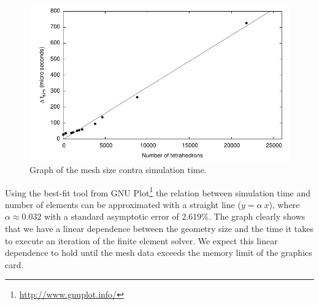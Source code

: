 \begin{figure}
  \centering
  \includegraphics[width=140mm]{./images/results_time_contra_mesh_size.pdf}
  \caption{Graph of the mesh size contra simulation time.}
  \label{fig:time-contra-mesh-size-graph}
\end{figure}

Using the best-fit tool from GNU
Plot\footnote{\url{http://www.gnuplot.info/}} the relation between
simulation time and number of elements can be approximated with a
straight line ($y = \alpha \ x$), where $\alpha \approx 0.032$
with a standard asymptotic error of $2.619\%$.
%
%
%
%
%
%
The graph clearly shows that we have a linear dependence
between the geometry size and the time it takes to execute an iteration
of the finite element solver. We expect this linear dependence to hold until
the mesh data exceeds the memory limit of the graphics card.



